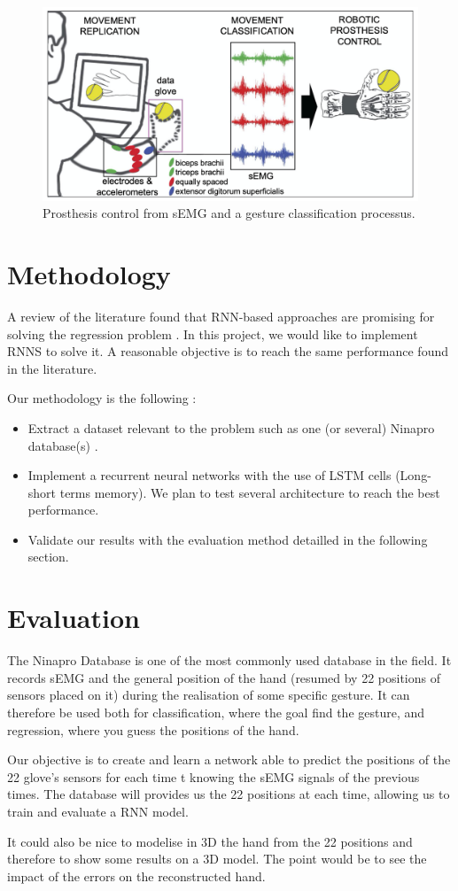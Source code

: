 \documentclass[12 pt]{article}
\begin{document}
\begin{figure}[!htbp]
	\centering
	\includegraphics[width=14cm]{plan}
	\caption{Prosthesis control from sEMG and a gesture classification processus. \cite{principe}}
\end{figure}

\section*{Methodology}
A review of the literature found that RNN-based approaches are promising for solving the regression problem \cite{Koch}.
In this project, we would like to implement RNNS to solve it. A reasonable objective is to reach the same performance found in the literature.

Our methodology is the following :
\begin{itemize}
	\item Extract a dataset relevant to the problem such as one (or several) Ninapro database(s) \cite{database}.
	\item Implement a recurrent neural networks with the use of LSTM cells (Long-short terms memory). We plan to test several architecture to reach the
	      best performance.
	\item Validate our results with the evaluation method detailled in the following section.
\end{itemize}

\section*{Evaluation}
The Ninapro Database \cite{database} is one of the most commonly used database in the field. It records sEMG and the general position of the hand
(resumed by 22 positions of sensors placed on it) during the realisation of some specific gesture. It can therefore be used both for classification,
where the goal find the gesture, and regression, where you guess the positions of the hand.

Our objective is to create and learn a network able to predict the positions of the 22 glove's sensors for each time t knowing the sEMG signals of the
previous times. The database will provides us the 22 positions at each time, allowing us to train and evaluate a RNN model.

It could also be nice to modelise in 3D the hand from the 22 positions and therefore to show some results on a 3D model. The point would be to
see the impact of the errors on the reconstructed hand.



\end{document}
